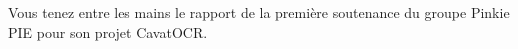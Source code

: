 Vous tenez entre les mains le rapport de la première soutenance du
groupe Pinkie PIE pour son projet CavatOCR.
